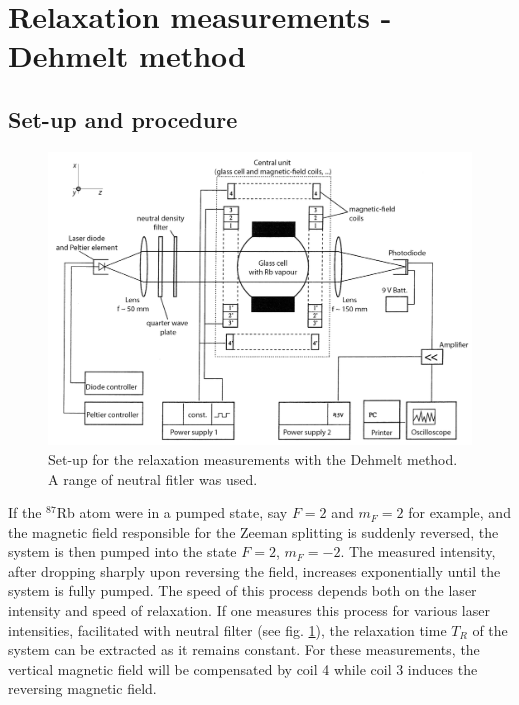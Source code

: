 \section{Relaxation measurements - Dehmelt method}
\subsection{Set-up and procedure}
\begin{figure}
\centering
\includegraphics[width=1.0\linewidth]{graphics/dehmeltsetup}
\caption[Set-up relaxation measurements - Dehmelt]{Set-up for the relaxation measurements with the Dehmelt method. A range of neutral fitler was used. \cite{anleitung}}
\label{fig:dehmeltsetup}
\end{figure}
If the $^{87}$Rb atom were in a pumped state, say $F=2$ and $m_F=2$ for example, and the magnetic field responsible for the Zeeman splitting is suddenly reversed, the system is then pumped into the state $F=2$, $m_F=-2$. The measured intensity, after dropping sharply upon reversing the field, increases exponentially until the system is fully pumped. The speed of this process depends both on the laser intensity and speed of relaxation. If one measures this process for various laser intensities, facilitated with neutral filter (see fig. \ref{fig:dehmeltsetup}), the relaxation time $T_R$ of the system can be extracted as it remains constant. For these measurements, the vertical magnetic field will be compensated by coil 4 while coil 3 induces the reversing magnetic field.


